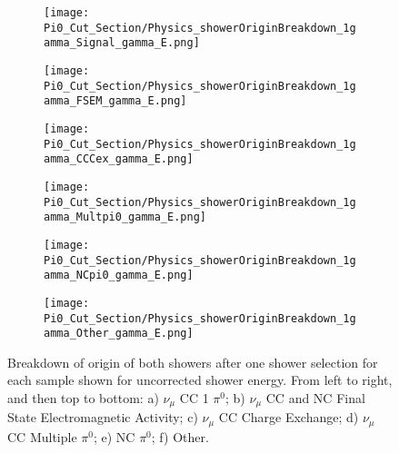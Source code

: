 \begin{figure}[H]
\centering
  \begin{subfigure}[H]{0.25\textwidth}
    \centering
\texttt{[image: Pi0\_Cut\_Section/Physics\_showerOriginBreakdown\_1gamma\_Signal\_gamma\_E.png]}
  \caption{ }
  \end{subfigure} 
  \hspace{4mm}
  \begin{subfigure}[H]{0.25\textwidth}
    \centering
\texttt{[image: Pi0\_Cut\_Section/Physics\_showerOriginBreakdown\_1gamma\_FSEM\_gamma\_E.png]}
  \caption{ }
  \end{subfigure} 
  \hspace{4mm}
  \begin{subfigure}[H]{0.25\textwidth}
    \centering
\texttt{[image: Pi0\_Cut\_Section/Physics\_showerOriginBreakdown\_1gamma\_CCCex\_gamma\_E.png]}
  \caption{ }
  \end{subfigure} 
  \hspace{4mm}
  \begin{subfigure}[H]{0.25\textwidth}
    \centering
\texttt{[image: Pi0\_Cut\_Section/Physics\_showerOriginBreakdown\_1gamma\_Multpi0\_gamma\_E.png]}
  \caption{ }
  \end{subfigure} 
  \hspace{4mm}
  \begin{subfigure}[H]{0.25\textwidth}
    \centering
\texttt{[image: Pi0\_Cut\_Section/Physics\_showerOriginBreakdown\_1gamma\_NCpi0\_gamma\_E.png]}
  \caption{ }
  \end{subfigure} 
  \hspace{4mm}
  \begin{subfigure}[H]{0.25\textwidth}
    \centering
\texttt{[image: Pi0\_Cut\_Section/Physics\_showerOriginBreakdown\_1gamma\_Other\_gamma\_E.png]}
  \caption{ }
  \end{subfigure} 
\caption{ Breakdown of origin of both showers after one shower selection for each sample shown for uncorrected shower energy.  From left to right, and then top to bottom: a) $\nu_{\mu}$ CC 1 $\pi^0$; b) $\nu_\mu$ CC and NC Final State Electromagnetic Activity; c) $\nu_{\mu}$ CC Charge Exchange; d) $\nu_\mu$ CC Multiple $\pi^0$; e) NC $\pi^0$; f) Other.  }
\label{fig:physics_showerOriginBreakdown_E}
\end{figure}


